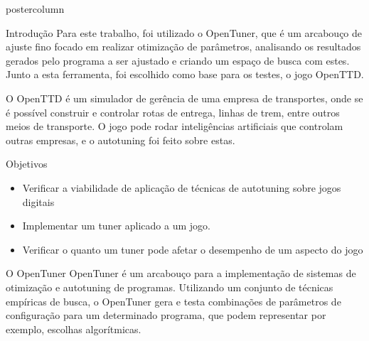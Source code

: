 \documentclass[final]{beamer}
\begin{document}
\begin{frame}
\begin{columns}
\begin{column}{.5\textwidth}
\begin{beamercolorbox}[center,wd=\textwidth]{postercolumn}
\begin{minipage}[T]{.95\textwidth}
{\begin{block}{Introdução}
                Para este trabalho, foi utilizado o OpenTuner, que é um arcabouço de ajuste fino focado em realizar otimização de parâmetros, analisando os resultados gerados pelo programa a ser ajustado e criando um espaço de busca com estes. Junto a esta ferramenta, foi escolhido como base para os testes, o jogo OpenTTD.
                
                \vspace*{0.15cm}
                
                O OpenTTD é um simulador de gerência de uma empresa de transportes, onde se é possível construir e controlar rotas de entrega, linhas de trem, entre outros meios de transporte. O jogo pode rodar inteligências artificiais que controlam outras empresas, e o autotuning foi feito sobre estas.

                
            \end{block}
            
            \vspace*{0.2cm}

            \begin{block}{Objetivos}
              \justifying
              \begin{itemize}
                \item Verificar a viabilidade de aplicação de técnicas de autotuning sobre jogos digitais 
                
                \vspace*{0.4cm}
                
                \item Implementar um tuner aplicado a um jogo.
                
                \vspace*{0.4cm}
                
                \item Verificar o quanto um tuner pode afetar o desempenho de um aspecto do jogo 
              \end{itemize}
              \vspace*{0.2cm} 
            \end{block}
            
            \vspace*{0.2cm}

            \begin{block}{O OpenTuner}
            \justifying
                OpenTuner é um arcabouço para a implementação de sistemas de otimização e autotuning de programas. Utilizando um conjunto de técnicas empíricas de busca, o OpenTuner gera e testa combinações de parâmetros de configuração para um determinado programa, que podem representar por exemplo, escolhas algorítmicas. 
                

\end{block}}
\end{minipage}
\end{beamercolorbox}
\end{column}
\end{columns}
\end{frame}
\end{document}
